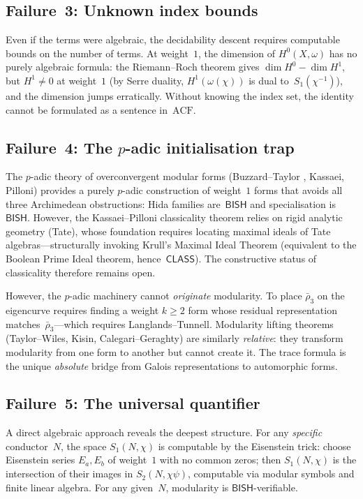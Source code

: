 \documentclass[11pt]{article}
\theoremstyle{plain}
\theoremstyle{definition}
\theoremstyle{remark}
\newcommand{\BISH}{\mathsf{BISH}}
\newcommand{\CLASS}{\mathsf{CLASS}}
\begin{document}
\subsection{Failure~3: Unknown index bounds}

Even if the terms were algebraic, the decidability descent
requires computable bounds on the number of terms.  At
weight~$1$, the dimension of $H^0(X, \omega)$ has no purely
algebraic formula: the Riemann--Roch theorem gives
$\dim H^0 - \dim H^1$, but $H^1 \ne 0$ at weight~$1$ (by
Serre duality, $H^1(\omega(\chi))$ is dual to~$S_1(\chi^{-1})$),
and the dimension jumps erratically.  Without knowing the index
set, the identity cannot be formulated as a sentence
in~$\mathrm{ACF}$.

\subsection{Failure~4: The $p$-adic initialisation trap}

The $p$-adic theory of overconvergent modular forms
(Buzzard--Taylor \cite{BuzzardTaylor1999}, Kassaei, Pilloni)
provides a purely $p$-adic construction of weight~$1$ forms
that avoids all three Archimedean obstructions: Hida families
are~$\BISH$ and specialisation is~$\BISH$.  However, the
Kassaei--Pilloni classicality theorem relies on rigid analytic
geometry (Tate), whose foundation requires locating maximal
ideals of Tate algebras---structurally invoking Krull's Maximal
Ideal Theorem (equivalent to the Boolean Prime Ideal theorem,
hence~$\CLASS$).  The constructive status of classicality
therefore remains open.

However, the $p$-adic machinery cannot \emph{originate}
modularity.  To place $\bar{\rho}_3$ on the eigencurve requires
finding a weight $k \ge 2$ form whose residual representation
matches~$\bar{\rho}_3$---which requires Langlands--Tunnell.
Modularity lifting theorems (Taylor--Wiles, Kisin,
Calegari--Geraghty) are similarly \emph{relative}: they
transform modularity from one form to another but cannot create
it.  The trace formula is the unique \emph{absolute} bridge
from Galois representations to automorphic forms.

\subsection{Failure~5: The universal quantifier}

A direct algebraic approach reveals the deepest structure.
For any \emph{specific} conductor~$N$, the space $S_1(N, \chi)$
is computable by the Eisenstein trick: choose Eisenstein series
$E_a, E_b$ of weight~$1$ with no common zeros; then $S_1(N,\chi)$
is the intersection of their images in $S_2(N,\chi\psi)$,
computable via modular symbols and finite linear algebra.
For any given~$N$, modularity is $\BISH$-verifiable.
\end{document}
